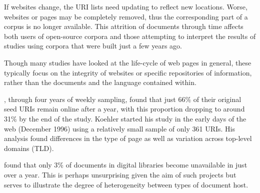 If websites change, the URI lists need updating to reflect new locations. 
Worse, websites or pages may be completely removed, thus the corresponding part of a corpus is no longer available.
This attrition of documents through time affects both users of open-source corpora 
and those attempting to interpret the results of studies using corpora that were built just a few years ago.

Though many studies have looked at the life-cycle of web pages in general, these typically focus on the integrity of websites or specific repositories of information, rather than the documents and the language contained within.



\cite{koehler2002web}, through four years of weekly sampling, found that just 66\% of their original seed URIs remain online after a year, with this proportion dropping to around 31\% by the end of the study.  Koehler started his study in the early days of the web (December 1996) using a relatively small sample of only 361 URIs.  His analysis found differences in the type of page as well as variation across top-level domains (TLD). %

\cite{nelson2002object} found that only 3\% of documents in digital libraries become unavailable in just over a year. This is perhaps unsurprising given the aim of such projects but serves to illustrate the degree of heterogeneity between types of document host.  




